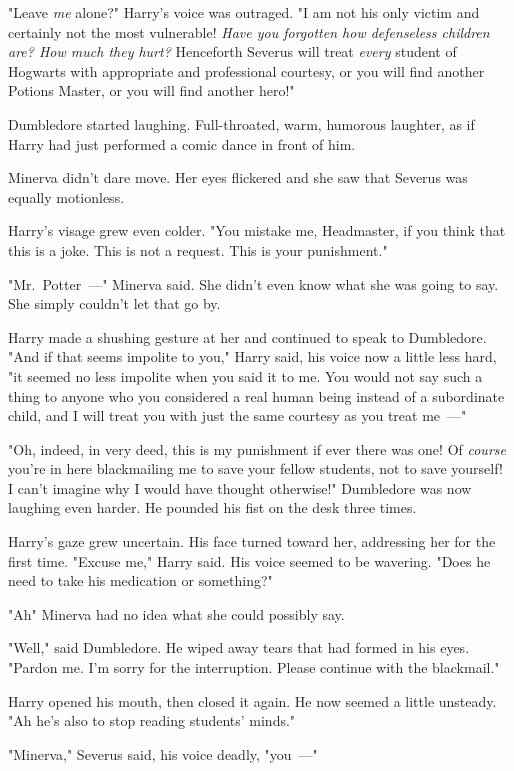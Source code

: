 "Leave \emph{me} alone?" Harry's voice was outraged. "I am not his only victim
and certainly not the most vulnerable! \emph{Have you forgotten how defenseless
children are? How much they hurt?} Henceforth Severus will treat \emph{every}
student of Hogwarts with appropriate and professional courtesy, or you will
find another Potions Master, or you will find another hero!"

Dumbledore started laughing. Full-throated, warm, humorous laughter, as if
Harry had just performed a comic dance in front of him.

Minerva didn't dare move. Her eyes flickered and she saw that Severus was
equally motionless.

Harry's visage grew even colder. "You mistake me, Headmaster, if you think that
this is a joke. This is not a request. This is your punishment."

"Mr.~Potter~---" Minerva said. She didn't even know what she was going to say.
She simply couldn't let that go by.

Harry made a shushing gesture at her and continued to speak to Dumbledore. "And
if that seems impolite to you," Harry said, his voice now a little less hard,
"it seemed no less impolite when you said it to me. You would not say such a
thing to anyone who you considered a real human being instead of a subordinate
child, and I will treat you with just the same courtesy as you treat me~---"

"Oh, indeed, in very deed, this is my punishment if ever there was one! Of
\emph{course} you're in here blackmailing me to save your fellow students, not
to save yourself! I can't imagine why I would have thought otherwise!"
Dumbledore was now laughing even harder. He pounded his fist on the desk three
times.

Harry's gaze grew uncertain. His face turned toward her, addressing her for the
first time. "Excuse me," Harry said. His voice seemed to be wavering. "Does he
need to take his medication or something?"

"Ah{\el}" Minerva had no idea what she could possibly say.

"Well," said Dumbledore. He wiped away tears that had formed in his eyes.
"Pardon me. I'm sorry for the interruption. Please continue with the blackmail."

Harry opened his mouth, then closed it again. He now seemed a little unsteady.
"Ah{\el} he's also to stop reading students' minds."

"Minerva," Severus said, his voice deadly, "you~---"

